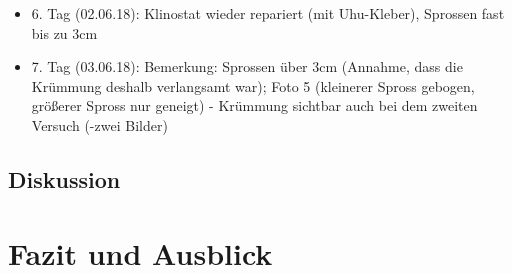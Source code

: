 \documentclass[
a4paper, 
11pt, 
ngerman,
listof=totoc,
bibliography=totocnumbered,
abstracton
]{scrreprt}
\begin{document}
\begin{itemize}
\item 6. Tag (02.06.18): Klinostat wieder repariert (mit Uhu-Kleber), Sprossen fast bis zu 3cm

\item 7. Tag (03.06.18): Bemerkung: Sprossen über 3cm (Annahme, dass die Krümmung deshalb verlangsamt war); Foto 5 (kleinerer Spross gebogen, größerer Spross nur geneigt)
- Krümmung sichtbar auch bei dem zweiten Versuch 
(-zwei Bilder)

\end{itemize}

\section{Diskussion}

\chapter{Fazit und Ausblick}


\printbibliography

% 
% 
%

\end{document}
